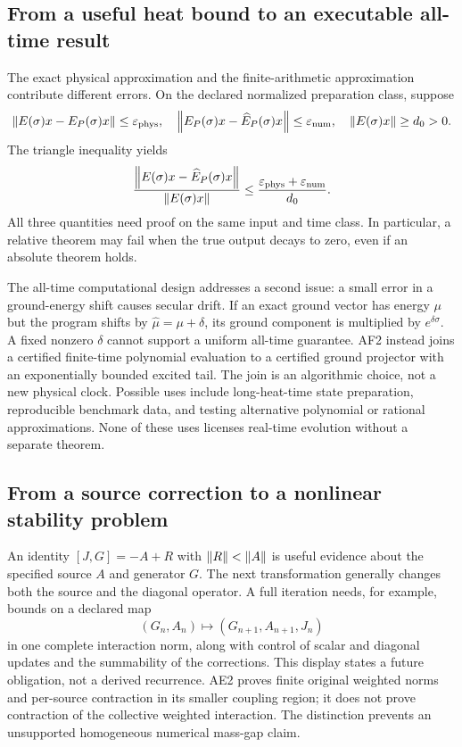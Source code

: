\subsection{From a useful heat bound to an executable all-time result}
The exact physical approximation and the finite-arithmetic approximation contribute different errors. On the declared normalized preparation class, suppose
\begin{equation}
 \left\lVert E(\sigma)x-E_P(\sigma)x\right\rVert\le\varepsilon_{\rm phys},\quad
 \left\lVert E_P(\sigma)x-\widehat E_P(\sigma)x\right\rVert\le\varepsilon_{\rm num},\quad
 \left\lVert E(\sigma)x\right\rVert\ge d_0>0.
\end{equation}
The triangle inequality yields
\begin{equation}
 \frac{\left\lVert E(\sigma)x-\widehat E_P(\sigma)x\right\rVert}
 {\left\lVert E(\sigma)x\right\rVert}
 \le\frac{\varepsilon_{\rm phys}+\varepsilon_{\rm num}}{d_0}.
\label{eq:error-accounting}
\end{equation}
All three quantities need proof on the same input and time class. In particular, a relative theorem may fail when the true output decays to zero, even if an absolute theorem holds.

The all-time computational design addresses a second issue: a small error in a ground-energy shift causes secular drift. If an exact ground vector has energy $\mu$ but the program shifts by $\widehat\mu=\mu+\delta$, its ground component is multiplied by $e^{\delta\sigma}$. A fixed nonzero $\delta$ cannot support a uniform all-time guarantee. AF2 instead joins a certified finite-time polynomial evaluation to a certified ground projector with an exponentially bounded excited tail. The join is an algorithmic choice, not a new physical clock. Possible uses include long-heat-time state preparation, reproducible benchmark data, and testing alternative polynomial or rational approximations. None of these uses licenses real-time evolution without a separate theorem.

\subsection{From a source correction to a nonlinear stability problem}
An identity $[J,G]=-A+R$ with $\left\lVert R\right\rVert<\left\lVert A\right\rVert$ is useful evidence about the specified source $A$ and generator $G$. The next transformation generally changes both the source and the diagonal operator. A full iteration needs, for example, bounds on a declared map
\begin{equation}
 (G_n,A_n)\longmapsto (G_{n+1},A_{n+1},J_n)
\end{equation}
in one complete interaction norm, along with control of scalar and diagonal updates and the summability of the corrections. This display states a future obligation, not a derived recurrence. AE2 proves finite original weighted norms and per-source contraction in its smaller coupling region; it does not prove contraction of the collective weighted interaction. The distinction prevents an unsupported homogeneous numerical mass-gap claim.

